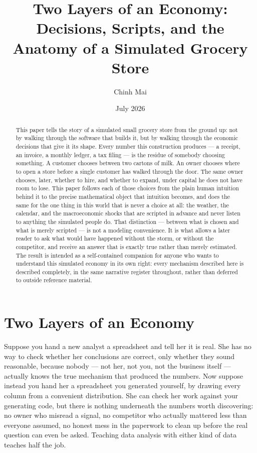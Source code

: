 \documentclass[12pt,a4paper]{article}
\title{\textbf{Two Layers of an Economy:\\
Decisions, Scripts, and the Anatomy of a Simulated Grocery Store}}
\author{Chinh Mai}
\date{July 2026}
\begin{document}
\maketitle

\begin{abstract}
This paper tells the story of a simulated small grocery store from the
ground up: not by walking through the software that builds it, but by
walking through the economic decisions that give it its shape. Every
number this construction produces --- a receipt, an invoice, a monthly
ledger, a tax filing --- is the residue of somebody choosing something. A
customer chooses between two cartons of milk. An owner chooses where to
open a store before a single customer has walked through the door. The
same owner chooses, later, whether to hire, and whether to expand, under
capital he does not have room to lose. This paper follows each of those
choices from the plain human intuition behind it to the precise
mathematical object that intuition becomes, and does the same for the one
thing in this world that is never a choice at all: the weather, the
calendar, and the macroeconomic shocks that are scripted in advance and
never listen to anything the simulated people do. That distinction ---
between what is chosen and what is merely scripted --- is not a modeling
convenience. It is what allows a later reader to ask what would have
happened without the storm, or without the competitor, and receive an
answer that is exactly true rather than merely estimated. The result is
intended as a self-contained companion for anyone who wants to
understand this simulated economy in its own right: every mechanism
described here is described completely, in the same narrative register
throughout, rather than deferred to outside reference material.
\end{abstract}

\clearpage

\section{Two Layers of an Economy}
\label{sec:intro}

Suppose you hand a new analyst a spreadsheet and tell her it is real. She
has no way to check whether her conclusions are correct, only whether
they sound reasonable, because nobody --- not her, not you, not the
business itself --- actually knows the true mechanism that produced the
numbers. Now suppose instead you hand her a spreadsheet you generated
yourself, by drawing every column from a convenient distribution. She can
check her work against your generating code, but there is nothing
underneath the numbers worth discovering: no owner who misread a signal,
no competitor who actually mattered less than everyone assumed, no honest
mess in the paperwork to clean up before the real question can even be
asked. Teaching data analysis with either kind of data teaches half the
job.
\end{document}
